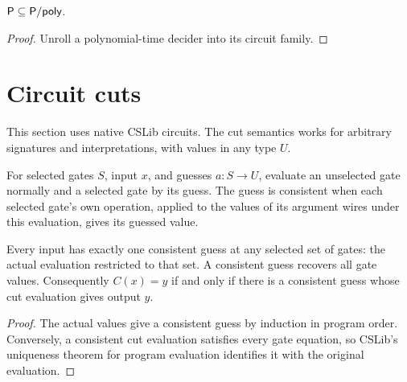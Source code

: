 \begin{theorem}
  \label{thm:circuits-p-subset-ppoly}
  \leanok
  $\mathsf{P} \subseteq \mathsf{P/poly}$.
\end{theorem}
\begin{proof}
  \leanok
  Unroll a polynomial-time decider into its circuit family.
\end{proof}

\section{Circuit cuts}
\label{sec:circuits-cuts}

This section uses native CSLib circuits. The cut semantics works for arbitrary
signatures and interpretations, with values in any type $U$.

\begin{definition}
  \label{def:circuits-cut-values}
  \leanok
  For selected gates $S$, input $x$, and guesses $a:S\to U$, evaluate an
  unselected gate normally and a selected gate by its guess. The guess is
  consistent when each selected gate's own operation, applied to the values
  of its argument wires under this evaluation, gives its guessed value.
\end{definition}

\begin{theorem}
  \label{thm:circuits-cut-certificate}
  \leanok
  Every input has exactly one consistent guess at any selected set of
  gates: the actual evaluation restricted to that set. A consistent guess
  recovers all gate values. Consequently $C(x)=y$ if and only if there is
  a consistent guess whose cut evaluation gives output $y$.
\end{theorem}
\begin{proof}
  \leanok
  The actual values give a consistent guess by induction in program order.
  Conversely, a consistent cut evaluation satisfies every gate equation,
  so CSLib's uniqueness theorem for program evaluation identifies it with
  the original evaluation.
\end{proof}

